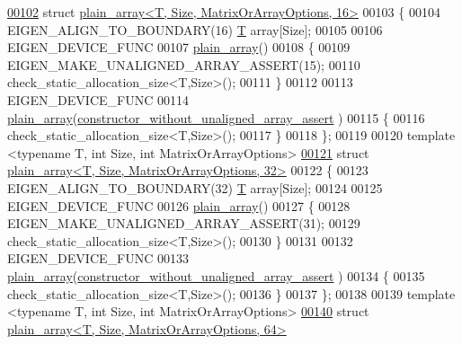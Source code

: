 \begin{DoxyCode}
\hyperlink{struct_eigen_1_1internal_1_1plain__array_3_01_t_00_01_size_00_01_matrix_or_array_options_00_0116_01_4}{00102} \textcolor{keyword}{struct }\hyperlink{struct_eigen_1_1internal_1_1plain__array_3_01_t_00_01_size_00_01_matrix_or_array_options_00_0116_01_4}{plain\_array<T, Size, MatrixOrArrayOptions, 16>}
00103 \{
00104   EIGEN\_ALIGN\_TO\_BOUNDARY(16) \hyperlink{group___sparse_core___module}{T} array[Size];
00105 
00106   EIGEN\_DEVICE\_FUNC
00107   \hyperlink{struct_eigen_1_1internal_1_1plain__array}{plain\_array}() 
00108   \{ 
00109     EIGEN\_MAKE\_UNALIGNED\_ARRAY\_ASSERT(15);
00110     check\_static\_allocation\_size<T,Size>();
00111   \}
00112 
00113   EIGEN\_DEVICE\_FUNC
00114   \hyperlink{struct_eigen_1_1internal_1_1plain__array}{plain\_array}(\hyperlink{struct_eigen_1_1internal_1_1constructor__without__unaligned__array__assert}{constructor\_without\_unaligned\_array\_assert}
      ) 
00115   \{ 
00116     check\_static\_allocation\_size<T,Size>();
00117   \}
00118 \};
00119 
00120 \textcolor{keyword}{template} <\textcolor{keyword}{typename} T, \textcolor{keywordtype}{int} Size, \textcolor{keywordtype}{int} MatrixOrArrayOptions>
\hyperlink{struct_eigen_1_1internal_1_1plain__array_3_01_t_00_01_size_00_01_matrix_or_array_options_00_0132_01_4}{00121} \textcolor{keyword}{struct }\hyperlink{struct_eigen_1_1internal_1_1plain__array_3_01_t_00_01_size_00_01_matrix_or_array_options_00_0132_01_4}{plain\_array<T, Size, MatrixOrArrayOptions, 32>}
00122 \{
00123   EIGEN\_ALIGN\_TO\_BOUNDARY(32) \hyperlink{group___sparse_core___module}{T} array[Size];
00124 
00125   EIGEN\_DEVICE\_FUNC
00126   \hyperlink{struct_eigen_1_1internal_1_1plain__array}{plain\_array}() 
00127   \{
00128     EIGEN\_MAKE\_UNALIGNED\_ARRAY\_ASSERT(31);
00129     check\_static\_allocation\_size<T,Size>();
00130   \}
00131 
00132   EIGEN\_DEVICE\_FUNC
00133   \hyperlink{struct_eigen_1_1internal_1_1plain__array}{plain\_array}(\hyperlink{struct_eigen_1_1internal_1_1constructor__without__unaligned__array__assert}{constructor\_without\_unaligned\_array\_assert}
      ) 
00134   \{ 
00135     check\_static\_allocation\_size<T,Size>();
00136   \}
00137 \};
00138 
00139 \textcolor{keyword}{template} <\textcolor{keyword}{typename} T, \textcolor{keywordtype}{int} Size, \textcolor{keywordtype}{int} MatrixOrArrayOptions>
\hyperlink{struct_eigen_1_1internal_1_1plain__array_3_01_t_00_01_size_00_01_matrix_or_array_options_00_0164_01_4}{00140} \textcolor{keyword}{struct }\hyperlink{struct_eigen_1_1internal_1_1plain__array_3_01_t_00_01_size_00_01_matrix_or_array_options_00_0164_01_4}{plain\_array<T, Size, MatrixOrArrayOptions, 64>}

\end{DoxyCode}
